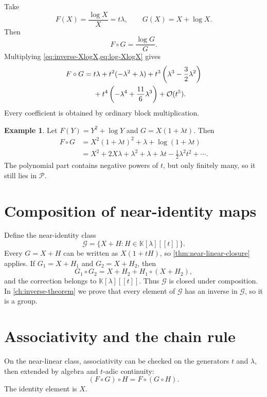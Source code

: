 \documentclass[11pt,openany]{book}
\theoremstyle{definition}
\newtheorem{example}{Example}[chapter]
\theoremstyle{plain}
\theoremstyle{remark}
\newcommand{\K}{\mathbb{K}}
\newcommand{\Plog}{\mathscr{P}}
\newcommand{\bigO}{\mathcal{O}}
\begin{document}
\begin{workedbox}
Take
\[
 F(X)=\frac{\log X}{X}=t\lambda,
 \qquad G(X)=X+\log X.
\]
Then
\[
 F\circ G=\frac{\log G}{G}.
\]
Multiplying \cref{eq:inverse-XlogX,eq:log-XlogX} gives
\begin{align}
 F\circ G={}&t\lambda+t^2(-\lambda^2+\lambda)
 +t^3\left(\lambda^3-\frac32\lambda^2\right)\notag\\
 &+t^4\left(-\lambda^4+\frac{11}{6}\lambda^3\right)
 +\bigO(t^5).
\label{eq:compose-log-over-x}
\end{align}
Every coefficient is obtained by ordinary block multiplication.
\end{workedbox}

\begin{example}
Let \(F(Y)=Y^2+\log Y\) and \(G=X(1+\lambda t)\). Then
\begin{align*}
 F\circ G
 &=X^2(1+\lambda t)^2+\lambda+\log(1+\lambda t)\\
 &=X^2+2X\lambda+\lambda^2+\lambda
 +\lambda t-\frac12\lambda^2t^2+\cdots.
\end{align*}
The polynomial part contains negative powers of \(t\), but only finitely many, so it still lies in \(\Plog\).
\end{example}

\section{Composition of near-identity maps}
Define the near-identity class
\begin{equation}\label{eq:near-identity-class}
 \mathcal G=\{X+H:H\in\K[\lambda][[t]]\}.
\end{equation}
Every \(G=X+H\) can be written as \(X(1+tH)\), so \cref{thm:near-linear-closure} applies. If \(G_1=X+H_1\) and \(G_2=X+H_2\), then
\begin{equation}\label{eq:near-identity-compose}
 G_1\circ G_2=X+H_2+H_1\circ(X+H_2),
\end{equation}
and the correction belongs to \(\K[\lambda][[t]]\). Thus \(\mathcal G\) is closed under composition. In \cref{ch:inverse-theorem} we prove that every element of \(\mathcal G\) has an inverse in \(\mathcal G\), so it is a group.

\section{Associativity and the chain rule}
On the near-linear class, associativity can be checked on the generators \(t\) and \(\lambda\), then extended by algebra and \(t\)-adic continuity:
\begin{equation}\label{eq:composition-associativity}
 (F\circ G)\circ H=F\circ(G\circ H).
\end{equation}
The identity element is \(X\).
\end{document}
